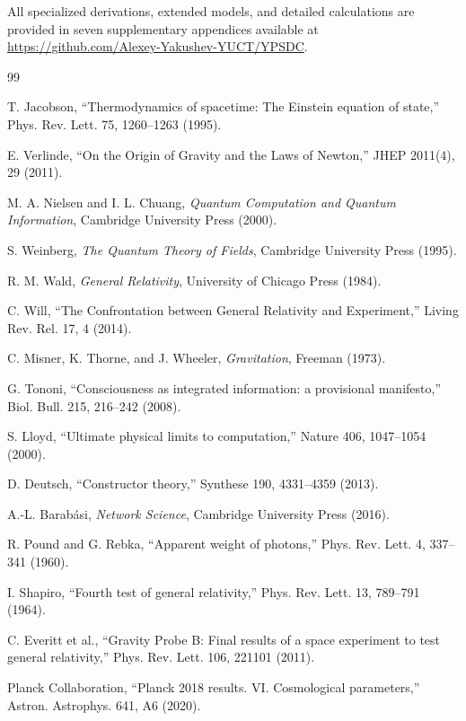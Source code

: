 \documentclass[11pt,a4paper]{article}
\begin{document}
	All specialized derivations, extended models, and detailed calculations 
	are provided in seven supplementary appendices available at 
	\url{https://github.com/Alexey-Yakushev-YUCT/YPSDC}.
	\begin{thebibliography}{99}
		
		 T. Jacobson, ``Thermodynamics of spacetime: The Einstein equation of state,'' Phys. Rev. Lett. 75, 1260–1263 (1995).
		
		 E. Verlinde, ``On the Origin of Gravity and the Laws of Newton,'' JHEP 2011(4), 29 (2011).
		
		 M. A. Nielsen and I. L. Chuang, \emph{Quantum Computation and Quantum Information}, Cambridge University Press (2000).
		
		 S. Weinberg, \emph{The Quantum Theory of Fields}, Cambridge University Press (1995).
		
		 R. M. Wald, \emph{General Relativity}, University of Chicago Press (1984).
		
		 C. Will, ``The Confrontation between General Relativity and Experiment,'' Living Rev. Rel. 17, 4 (2014).
		
		 C. Misner, K. Thorne, and J. Wheeler, \emph{Gravitation}, Freeman (1973).
		
		 G. Tononi, ``Consciousness as integrated information: a provisional manifesto,'' Biol. Bull. 215, 216–242 (2008).
		
		 S. Lloyd, ``Ultimate physical limits to computation,'' Nature 406, 1047–1054 (2000).
		
		 D. Deutsch, ``Constructor theory,'' Synthese 190, 4331–4359 (2013).
		
		 A.-L. Barabási, \emph{Network Science}, Cambridge University Press (2016).
		
		 R. Pound and G. Rebka, ``Apparent weight of photons,'' Phys. Rev. Lett. 4, 337–341 (1960).
		
		 I. Shapiro, ``Fourth test of general relativity,'' Phys. Rev. Lett. 13, 789–791 (1964).
		
		 C. Everitt et al., ``Gravity Probe B: Final results of a space experiment to test general relativity,'' Phys. Rev. Lett. 106, 221101 (2011).
		
		 Planck Collaboration, ``Planck 2018 results. VI. Cosmological parameters,'' Astron. Astrophys. 641, A6 (2020).
		

\end{thebibliography}
\end{document}
